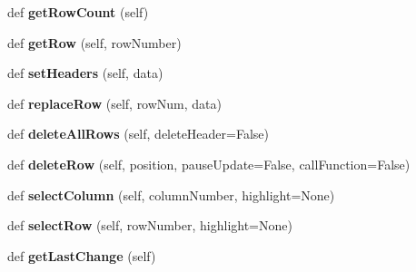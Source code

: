 \begin{DoxyCompactItemize}
def {\bfseries get\+Row\+Count} (self)
\item 
\mbox{\label{class_python_01_g_u_i_1_1appjar_1_1_simple_table_a4c9b7abeacd4fc061d25469f23d43b0a}} 
def {\bfseries get\+Row} (self, row\+Number)
\item 
\mbox{\label{class_python_01_g_u_i_1_1appjar_1_1_simple_table_a2949c02f35db480e96afe331a7029ce4}} 
def {\bfseries set\+Headers} (self, data)
\item 
\mbox{\label{class_python_01_g_u_i_1_1appjar_1_1_simple_table_ad9df4a2620ae6f5974faf76b63860235}} 
def {\bfseries replace\+Row} (self, row\+Num, data)
\item 
\mbox{\label{class_python_01_g_u_i_1_1appjar_1_1_simple_table_abca7c946e2a7224512d6f6aa41233b65}} 
def {\bfseries delete\+All\+Rows} (self, delete\+Header=False)
\item 
\mbox{\label{class_python_01_g_u_i_1_1appjar_1_1_simple_table_a99c4936b4f2737c25ae14ef5d949fddd}} 
def {\bfseries delete\+Row} (self, position, pause\+Update=False, call\+Function=False)
\item 
\mbox{\label{class_python_01_g_u_i_1_1appjar_1_1_simple_table_aeb08950cfc3f66749ca65aee7e0499c9}} 
def {\bfseries select\+Column} (self, column\+Number, highlight=None)
\item 
\mbox{\label{class_python_01_g_u_i_1_1appjar_1_1_simple_table_a2a90d230aad963c19a052766ba1ddcc5}} 
def {\bfseries select\+Row} (self, row\+Number, highlight=None)
\item 
\mbox{\label{class_python_01_g_u_i_1_1appjar_1_1_simple_table_aafcbee7952efe4b030fa251a9c112da6}} 
def {\bfseries get\+Last\+Change} (self)
\item 
\mbox{\label{class_python_01_g_u_i_1_1appjar_1_1_simple_table_a292b32bbb499c9a0135ac93fb50dba50}} 

\end{DoxyCompactItemize}
